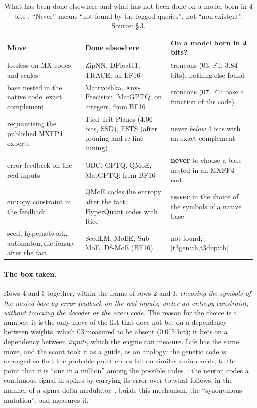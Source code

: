 \begin{table}[tbp]
\centering\small
\begin{tabularx}{\linewidth}{>{\raggedright\arraybackslash}X >{\raggedright\arraybackslash}X >{\raggedright\arraybackslash}X}
\toprule
Move & Done elsewhere & On a model born in 4 bits? \\
\midrule
lossless on MX codes and scales & ZipNN, DFloat11, TRACE: on BF16 & troncons (03, F1: 3.84 bits); nothing else found \\
base nested in the native code, exact complement & Matryoshka, Any-Precision, MatGPTQ: on integers, from BF16 & troncons (07, F1: base a function of the code) \\
requantising the published MXFP4 experts & Tied Trit-Planes (4.06 bits, SSD), ESTS (after pruning and re-fine-tuning) & never \emph{below} 4 bits with an exact complement \\
error feedback on the real inputs & OBC, GPTQ, QMoE, MatGPTQ: from BF16 & \textbf{never} to choose a base nested in an MXFP4 code \\
entropy constraint in the feedback & QMoE codes the entropy after the fact; HyperQuant codes with Rice & \textbf{never} in the choice of the symbols of a native base \\
seed, hypernetwork, automaton, dictionary after the fact & SeedLM, MoBE, Sub-MoE, D$^2$-MoE (BF16) & not found; \cref{t3gen:ch,t3dup:ch} \\
\bottomrule
\end{tabularx}
\caption[The empty box]{What has been done elsewhere and what has not been done on a model born in 4 bits \litt. ``Never'' means ``not found by the logged queries'', not ``non-existent''. Source:  §\,3.}
\label{t3que:tab:case}
\end{table}

\paragraph{The box taken.} Rows 4 and 5 together, within the frame of rows 2 and 3: \emph{choosing the symbols of the nested base by error feedback on the real inputs, under an entropy constraint, without touching the decoder or the exact code}. The reason for the choice is a number: it is the only move of the list that does not bet on a dependency between weights, which 03 measured to be absent (0.005 bit); it bets on a dependency between \emph{inputs}, which the engine can measure. Life has the same move, and the scout took it as a guide, as an analogy: the genetic code is arranged so that the probable point errors fall on similar amino acids, to the point that it is ``one in a million'' among the possible codes~\cite{freeland1998}; the neuron codes a continuous signal in spikes by carrying its error over to what follows, in the manner of a sigma-delta modulator~\cite{yoon2017sigmadelta}.  builds this mechanism, the ``synonymous mutation'', and measures it.

